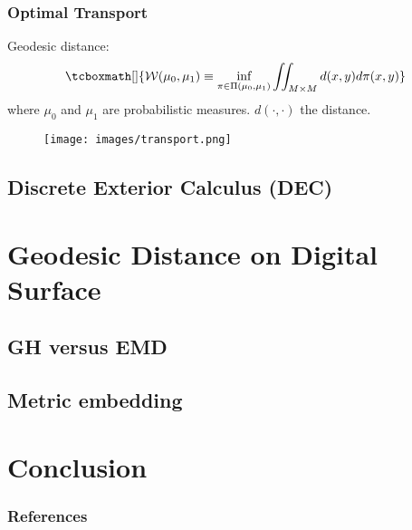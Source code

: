 \documentclass{beamer}
\newcommand{\gatherblock}[2][]{\begin{gather*}\tcboxmath[#1]{#2}\end{gather*}}
\begin{document}
\begin{frame}
	\frametitle{Optimal Transport}
	Geodesic distance:
	\gatherblock{
	\mathcal{W}(\mu_0,\mu_1) \equiv \underset{\pi\in\Pi(\mu_0,\mu_1)}{\text{inf}}\iint_{M\times M}d(x,y)d\pi(x,y)}
	where $\mu_0$ and $\mu_1$ are probabilistic measures. $d(\cdot,\cdot)$ the distance.
	\begin{figure}
		\texttt{[image: images/transport.png]}
	\end{figure}
\end{frame}



\subsection{Discrete Exterior Calculus (DEC)}

\begin{frame}	
	
\end{frame} 

\section{Geodesic Distance on Digital Surface}

\begin{frame}	
	
\end{frame} 

\subsection{GH versus EMD}

\begin{frame}	
	
\end{frame} 

\subsection{Metric embedding}

\begin{frame}	
	
\end{frame} 

\section{Conclusion}

\begin{frame}	
	
\end{frame} 

\begin{frame}[allowframebreaks]
	\frametitle{References}
	
	
\end{frame}
	
\end{document}
